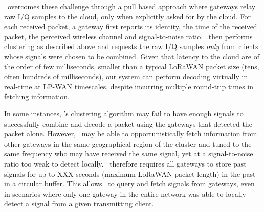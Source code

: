  \name\ overcomes these challenge through a pull based approach where gateways relay raw I/Q samples to the cloud, only when explicitly asked for by the cloud. For each received packet, a gateway first reports its identity, the time of the received packet, the perceived wireless channel and signal-to-noise ratio. \name\ then performs clustering as described above and requests the raw I/Q samples {\it only } from clients whose signals were chosen to be combined. Given that latency to the cloud are of the order of few milliseconds, smaller than a typical LoRaWAN packet size (tens, often hundreds of milliseconds), our system can perform decoding virtually in real-time at LP-WAN timescales, despite incurring multiple round-trip times in fetching information.\vspace*{0.1in}

 In some instances, \name's clustering algorithm may fail to have enough signals to successfully combine and decode a packet using the gateways that detected the packet alone. However, \name\ may be able to opportunistically fetch information from other gateways in the same geographical region of the cluster and tuned to the same frequency who may have received the same signal, yet at a signal-to-noise ratio too weak to detect locally. \name\ therefore requires all gateways to store past signals for up to XXX seconds (maximum LoRaWAN packet length) in the past in a circular buffer. This allows \name\ to query and fetch signals from gateways, even in scenarios where only one gateway in the entire network was able to locally detect a signal from a given transmitting client. 




